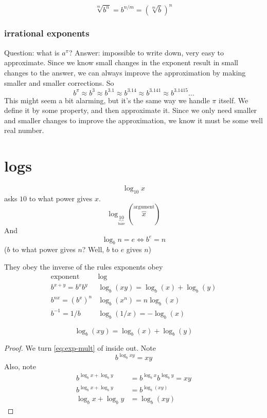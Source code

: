 \documentclass[10pt]{scrartcl}
\begin{document}
\begin{cor}
  \begin{equation}
    \sqrt[m]{b^n}=b^{n/m}=\left(\sqrt[m]{b}\right)^n
    \label{eq:exp-rat}
  \end{equation}
\end{cor}
\subsubsection{irrational exponents}
Question: what is $a^\pi$?
Answer: impossible to write down, very easy to approximate. Since we know small changes in the exponent result in small changes to the answer, we can always improve the approximation by making smaller and smaller corrections. So
\[
b^\pi \approx b^{3} \approx b^{3.1} \approx b^{3.14}\approx b^{3.141} \approx b^{3.1415} \dots
\]
This might seem a bit alarming, but it's the same way we handle $\pi$ itself. We define it by some property, and then approximate it. Since we only need smaller and smaller changes to improve the approximation, we know it must be some well real number. 
\section{logs}
\[
\log_{10}{x}
\]
asks $10$ to what power gives $x$. 
\[
\log_{\underbrace{10}_{\textrm{base}}}\left(\overbrace{x}^{\textrm{argument}}\right)
\]
And 
\[
\log_b n = e\iff  b^e=n 
\]
($b$ to what power gives $n$? Well, $b$ to $e$ gives $n$)

They obey the inverse of the rules exponents obey
\[
\begin{array}{l|l}
  \textrm{exponent} & \textrm{log} \\
  \hline
  b^{x+y}=b^xb^y & \log_b (xy)=\log_b(x)+\log_b(y) \\
  b^{nx} = (b^{x})^n & \log_b(x^n)=n\log_b(x) \\
  b^{-1} = 1/b & \log_b(1/x)=-\log_b (x)
\end{array}
\]
\begin{theorem}
  \begin{equation}
    \label{eq:log-mult}
    \log_b(xy)=\log_b(x)+\log_b(y)
  \end{equation}
\end{theorem}
\begin{proof}
  We turn \cref{eq:exp-mult} of  inside out. 
  Note
  \[
  b^{\log_b xy} = xy
  \]
  Also, note 
  \begin{align*}
    b^{\log_b x+\log_b y} &= b^{\log_b x}b^{\log_b y} =xy \\
    b^{\log_b x + \log_b y}&= b^{\log_b(xy)} \\
    \log_b x + \log_b y &= \log_b(xy)
  \end{align*}
\end{proof}
\end{document}
